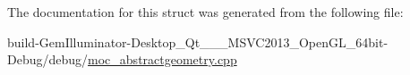 The documentation for this struct was generated from the following file\+:\begin{DoxyCompactItemize}
\item 
build-\/\+Gem\+Illuminator-\/\+Desktop\+\_\+\+Qt\+\_\+\_\+\_\+\+M\+S\+V\+C2013\+\_\+\+Open\+G\+L\+\_\+64bit-\/\+Debug/debug/\hyperlink{moc__abstractgeometry_8cpp}{moc\+\_\+abstractgeometry.\+cpp}\end{DoxyCompactItemize}
